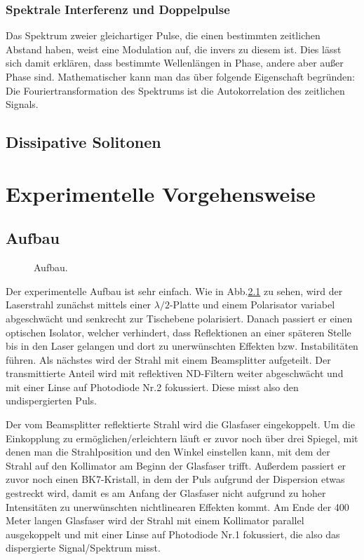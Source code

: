 \documentclass[bachelor,       %
               twoside,        %
               BCOR10mm,       %
               english,ngerman, %
               ]{GAUBM}
\begin{document}
\subsection{Spektrale Interferenz und Doppelpulse}
Das Spektrum zweier gleichartiger Pulse, die einen bestimmten zeitlichen Abstand haben, weist eine Modulation auf, die invers zu diesem ist.
Dies lässt sich damit erklären, dass bestimmte Wellenlängen in Phase, andere aber außer Phase sind.
Mathematischer kann man das über folgende Eigenschaft begründen:
Die Fouriertransformation des Spektrums ist die Autokorrelation des zeitlichen Signals.

\section{Dissipative Solitonen}

\chapter{Experimentelle Vorgehensweise}
\section{Aufbau}
\begin{figure}[!htb]
	\centering
	\def\svgwidth{\columnwidth}
	
	\caption{Aufbau.}
	\label{fig:DFTSetup}
\end{figure}
Der experimentelle Aufbau ist sehr einfach.
Wie in Abb.\ref{fig:DFTSetup} zu sehen, wird der Laserstrahl zunächst mittels einer $\lambda/2$-Platte und einem Polarisator variabel abgeschwächt und senkrecht zur Tischebene polarisiert.
Danach passiert er einen optischen Isolator, welcher verhindert, dass Reflektionen an einer späteren Stelle bis in den Laser gelangen und dort zu unerwünschten Effekten bzw. Instabilitäten führen.
Als nächstes wird der Strahl mit einem Beamsplitter aufgeteilt.
Der transmittierte Anteil wird mit reflektiven ND-Filtern weiter abgeschwächt und mit einer Linse auf Photodiode Nr.2 fokussiert.
Diese misst also den undispergierten Puls.

Der vom Beamsplitter reflektierte Strahl wird die Glasfaser eingekoppelt.
Um die Einkopplung zu ermöglichen/erleichtern läuft er zuvor noch über drei Spiegel, mit denen man die Strahlposition und den Winkel einstellen kann, mit dem der Strahl auf den Kollimator am Beginn der Glasfaser trifft.
Außerdem passiert er zuvor noch einen BK7-Kristall, in dem der Puls aufgrund der Dispersion etwas gestreckt wird, damit es am Anfang der Glasfaser nicht aufgrund zu hoher Intensitäten zu unerwünschten nichtlinearen Effekten kommt.
Am Ende der 400 Meter langen Glasfaser wird der Strahl mit einem Kollimator parallel ausgekoppelt und mit einer Linse auf Photodiode Nr.1 fokussiert, die also das dispergierte Signal/Spektrum misst.
\end{document}
